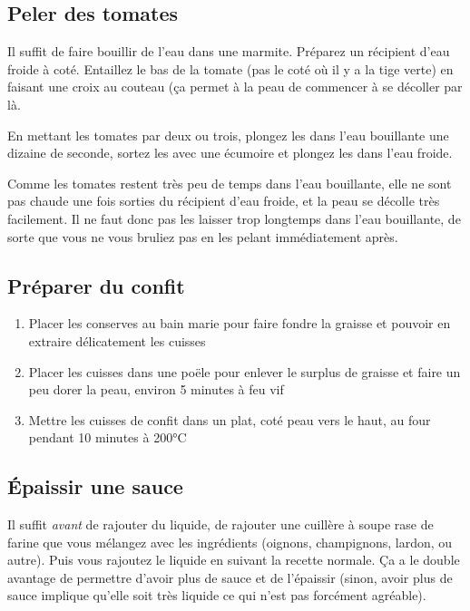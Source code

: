 \documentclass[a4paper,twoside,openright]{report}
\begin{document}
\subsection{Peler des tomates}\label{sec:peler_tomate}
Il suffit de faire bouillir de l'eau dans une marmite. Préparez un récipient d'eau froide à coté.
Entaillez le bas de la tomate (pas le coté où il y a la tige verte) en faisant une croix au couteau (ça permet à la peau de commencer à se décoller par là. 

En mettant les tomates par deux ou trois, plongez les dans l'eau bouillante une dizaine de seconde, sortez les avec une écumoire et plongez les dans l'eau froide. 

\begin{remarque}
Comme les tomates restent très peu de temps dans l'eau bouillante, elle ne sont pas chaude une fois sorties du récipient d'eau froide, et la peau se décolle très facilement. Il ne faut donc pas les laisser trop longtemps dans l'eau bouillante, de sorte que vous ne vous bruliez pas en les pelant immédiatement après.
\end{remarque}

\subsection{Préparer du confit}
\begin{enumerate}
 \item Placer les conserves au bain marie pour faire fondre la graisse et pouvoir en extraire délicatement les cuisses
 \item Placer les cuisses dans une poële pour enlever le surplus de graisse et faire un peu dorer la peau, environ 5 minutes à feu vif
 \item Mettre les cuisses de confit dans un plat, coté peau vers le haut, au four pendant 10 minutes à 200°C
\end{enumerate}



\subsection{Épaissir une sauce}
Il suffit \emph{avant} de rajouter du liquide, de rajouter une cuillère à soupe rase de farine que vous mélangez avec les ingrédients (oignons, champignons, lardon, ou autre). Puis vous rajoutez le liquide en suivant la recette normale. Ça a le double avantage de permettre d'avoir plus de sauce et de l'épaissir (sinon, avoir plus de sauce implique qu'elle soit très liquide ce qui n'est pas forcément agréable).
\end{document}
